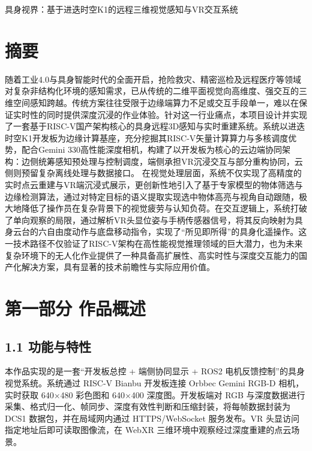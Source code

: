 \documentclass[UTF8,a4paper,zihao=-4]{ctexart}
\begin{document}
\begin{center}
{\fontsize{18pt}{22pt}\selectfont 具身视界：基于进迭时空K1的远程三维视觉感知与VR交互系统}
\end{center}


\section*{摘要}

随着工业4.0与具身智能时代的全面开启，抢险救灾、精密巡检及远程医疗等领域对复杂非结构化环境的感知需求，已从传统的二维平面视觉向高维度、强交互的三维空间感知跨越。传统方案往往受限于边缘端算力不足或交互手段单一，难以在保证实时性的同时提供深度沉浸的作业体验。针对这一行业痛点，本项目设计并实现了一套基于RISC-V国产架构核心的具身远程3D感知与实时重建系统。系统以进迭时空K1开发板为边缘计算基座，充分挖掘其RISC-V矢量计算算力与多核调度优势，配合Gemini 330高性能深度相机，构建了以开发板为核心的云边端协同架构：边侧统筹感知预处理与控制调度，端侧承担VR沉浸交互与部分重构协同，云侧则预留复杂离线处理与数据接口。 在视觉处理层面，系统不仅实现了高精度的实时点云重建与VR端沉浸式展示，更创新性地引入了基于专家模型的物体筛选与边缘检测算法，通过对特定目标的语义提取实现选中物体高亮与视角自动跟随，极大地降低了操作员在复杂背景下的视觉疲劳与认知负荷。在交互逻辑上，系统打破了单向观察的局限，通过解析VR头显位姿与手柄传感器信号，将其反向映射为具身云台的六自由度动作与底盘移动指令，实现了“所见即所得”的具身化遥操作。这一技术路径不仅验证了RISC-V架构在高性能视觉推理领域的巨大潜力，也为未来复杂环境下的无人化作业提供了一种具备高扩展性、高实时性与深度交互能力的国产化解决方案，具有显著的技术前瞻性与实际应用价值。

\section*{第一部分 作品概述}

\subsection*{1.1 功能与特性}

本作品实现的是一套“开发板总控 + 端侧协同显示 + ROS2 电机反馈控制”的具身视觉系统。系统通过 RISC-V Bianbu 开发板连接 Orbbec Gemini RGB-D 相机，实时获取 640$\times$480 彩色图和 640$\times$400 深度图。开发板端对 RGB 与深度数据进行采集、格式归一化、帧同步、深度有效性判断和压缩封装，将每帧数据封装为 DCS1 数据包，并在局域网内通过 HTTPS/WebSocket 服务发布。VR 头显访问指定地址后即可读取图像流，在 WebXR 三维环境中观察经过深度重建的点云场景。
\end{document}
